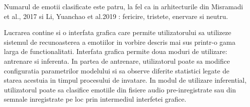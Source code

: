 \documentclass[a4paper,12pt]{book}
\begin{document}
					Numarul de emotii clasificate este patru, la fel ca in arhitecturile din Misramadi et al., 2017 \cite{misramadi} si	Li, Yuanchao et al.2019 \cite{yuan}: fericire, tristete, enervare si neutru. \par
					
					Lucrarea contine si o interfata grafica care permite utilizatorului sa utilizeze sistemul de recunoasterea a emotiilor in vorbire descris mai sus printr-o gama larga de functionalitati. Interfata grafica permite doua moduri de utilizare: antrenare si inferenta. In partea de antrenare, utilizatorul poate sa modifice configuratia parametrilor modelului si sa observe diferite statistici legate de starea acestuia in timpul procesului de invatare. In modul de utilizare inferential, utilizatorul poate sa clasifice emotiile din fisiere audio pre-inregistrate sau din semnale inregistrate pe loc prin intermediul interfetei grafice.\par				
\end{document}
